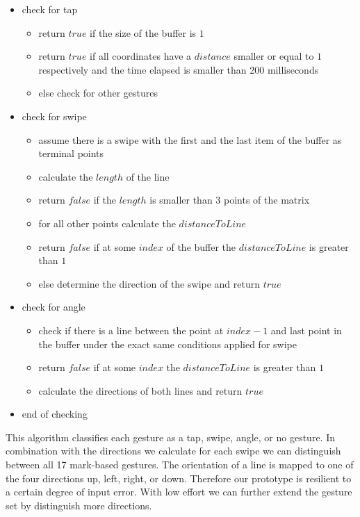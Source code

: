 \begin{tt}
\begin{itemize}
\item check for tap
	\begin{itemize}
		\item return $true$ if the size of the buffer is $1$ 
		\item return $true$ if all coordinates have a $distance$ smaller or equal to $1$ respectively and the time elapsed is smaller than 200 milliseconds
		\item else check for other gestures
	\end{itemize}
\item check for swipe
	\begin{itemize}
	\item assume there is a swipe with the first and the last item of the buffer as terminal points
	\item calculate the $length$ of the line
	\item return $false$ if the $length$ is smaller than $3$ points of the matrix
	\item for all other points calculate the $distanceToLine$ 
	\item return $false$ if at some $index$ of the buffer the $distanceToLine$ is greater than $1$
	\item else determine the direction of the swipe and return $true$
	\end{itemize}
\item check for angle
	\begin{itemize}
	\item check if there is a line between the point at $ index - 1$ and last point in the buffer under the exact same conditions applied for swipe
	\item return $false$ if at some $index$ the $distanceToLine$ is greater than $1$
	\item calculate the directions of both lines and return $true$
	\end{itemize}
\item end of checking 
\end{itemize}
\end{tt}
This algorithm classifies each gesture as a tap, swipe, angle, or no gesture. In combination with the directions we calculate for each swipe we can distinguish between all 17 mark-based gestures. The orientation of a line is mapped to one of the four directions up, left, right, or down. Therefore our prototype is resilient to a certain degree of input error. With low effort we can further extend the gesture set by distinguish more directions. 

